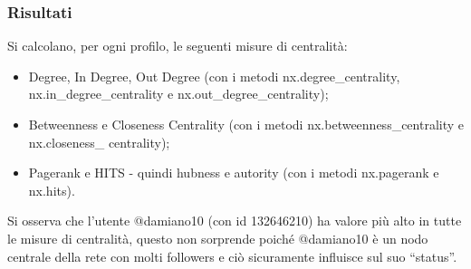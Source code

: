 \documentclass[a4paper, 12pt, twoside]{article}
\begin{document}
\subsubsection{Risultati}
Si calcolano, per ogni profilo, le seguenti misure di centralità:
\begin{itemize}
    \item Degree, In Degree, Out Degree (con i metodi nx.degree\_centrality, nx.in\_degree\_centrality e nx.out\_degree\_centrality);
    \item Betweenness e Closeness Centrality (con i metodi nx.betweenness\_centrality e nx.closeness\_ centrality);
    \item Pagerank e HITS - quindi hubness e autority (con i metodi nx.pagerank e nx.hits).
\end{itemize}
Si osserva che l’utente @damiano10 (con id 132646210) ha valore più alto in tutte le misure di centralità, questo non sorprende poiché @damiano10 è un nodo centrale della rete con molti followers e ciò sicuramente influisce sul suo “status”.
\end{document}
